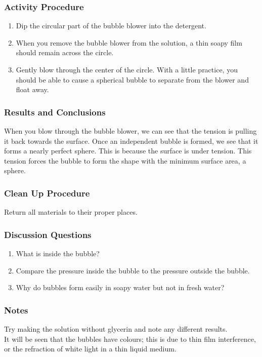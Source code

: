 \subsubsection*{Activity Procedure}
\begin{enumerate}
\item{Dip the circular part of the bubble blower into the detergent.}
\item{When you remove the bubble blower from the solution, a thin soapy film should remain across the circle.}
\item{Gently blow through the center of the circle. With a little practice, you should be able to cause a spherical bubble to separate from the blower and float away.}
\end{enumerate}

\subsubsection*{Results and Conclusions}
When you blow through the bubble blower, we can see that the tension is pulling it back towards the surface. Once an independent bubble is formed, we see that it forms a nearly perfect sphere. This is because the surface is under tension. This tension forces the bubble to form the shape with the minimum surface area, a sphere.

\subsubsection*{Clean Up Procedure}
Return all materials to their proper places.

\subsubsection*{Discussion Questions}
\begin{enumerate}
\item{What is inside the bubble?}
\item{Compare the pressure inside the bubble to the pressure outside the bubble.}
\item{Why do bubbles form easily in soapy water but not in fresh water?}
\end{enumerate}

\subsubsection*{Notes}
Try making the solution without glycerin and note any different results.\\
It will be seen that the bubbles have colours; this is due to thin film interference, or the refraction of white light in a thin liquid medium.

